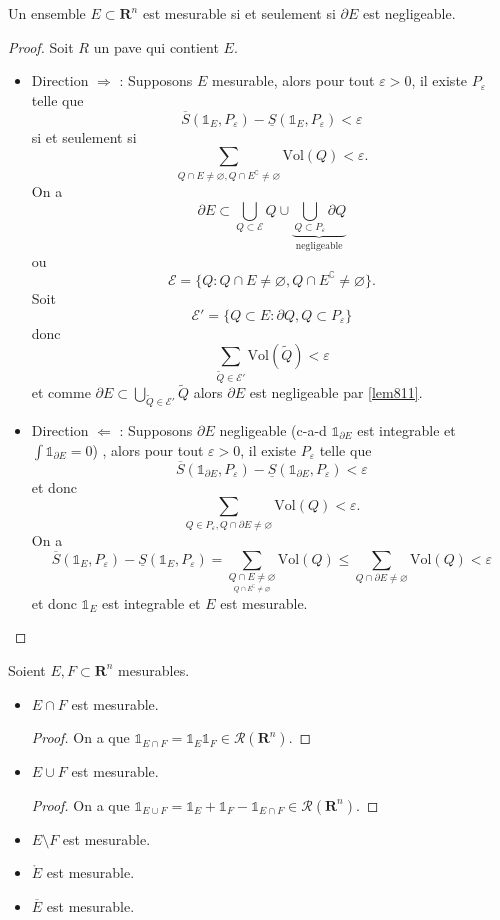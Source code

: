\begin{theorem}
Un ensemble $E\subset \mathbf{R}^{n}$ est mesurable si et seulement si $\partial E$ est negligeable.
\end{theorem}
\begin{proof}
Soit $R$ un pave qui contient $E$. 
\begin{itemize}
\item Direction $\Rightarrow$ : Supposons $E$ mesurable, alors pour tout $\varepsilon>0$, il existe $P_{\varepsilon}$ telle que 
$$
\overline{S}(\mathbb{1}_{E},P_{\varepsilon})-\underline{S}(\mathbb{1}_{E},P_{\varepsilon})<\varepsilon
$$
si et seulement si
$$
\sum _{Q\cap E\neq \varnothing, Q\cap E^{\complement}\neq\varnothing} \mathrm{Vol}(Q)<\varepsilon.
$$
On a 
$$
\partial E\subset \bigcup _{Q\subset \mathcal{E}}Q\cup \underbrace{ \bigcup _{Q\subset P_{\varepsilon}}\partial Q }_{ \text{negligeable} }
$$
ou
$$
\mathcal{E}=\{ Q:Q\cap E\neq \varnothing, Q\cap E^{\complement}\neq \varnothing \}.
$$
Soit 
$$
\mathcal{E}'=\{ Q\subset E:\partial Q,Q\subset P_{\varepsilon} \}
$$
donc
$$
\sum _{\tilde{Q}\in \mathcal{E}'}\mathrm{Vol}(\tilde{Q})<\varepsilon
$$
et comme $\partial E\subset \bigcup _{\tilde{Q}\in \mathcal{E}'}\tilde{Q}$ alors $\partial E$ est negligeable par \ref{lem811}.
\item Direction $\Leftarrow$ : Supposons $\partial E$ negligeable (c-a-d $\mathbb{1}_{\partial E}$ est integrable et $\int \mathbb{1}_{\partial E}=0$) , alors pour tout $\varepsilon>0$, il existe $P_{\varepsilon}$ telle que
$$
\overline{S}(\mathbb{1}_{\partial E},P_{\varepsilon})-\underline{S}(\mathbb{1}_{\partial E},P_{\varepsilon})<\varepsilon
$$
et donc
$$
\sum _{Q\in P_{\varepsilon},Q\cap \partial E\neq \varnothing} \mathrm{Vol}(Q)<\varepsilon.
$$
On a
$$
\overline{S}(\mathbb{1}_{E},P_{\varepsilon})-\underline{S}(\mathbb{1}_{E},P_{\varepsilon})=\sum _{\underset{Q\cap E^{\complement}\neq \varnothing}{Q\cap E\neq \varnothing }}\mathrm{Vol}(Q)\le \sum _{Q\cap \partial E\neq \varnothing}\mathrm{Vol}(Q)<\varepsilon
$$
et donc $\mathbb{1}_{E}$ est integrable et $E$ est mesurable. 
\end{itemize}
\end{proof}
\begin{remark}
Soient $E,F\subset \mathbf{R}^{n}$ mesurables. 
\begin{itemize}
\item $E\cap F$ est mesurable.
\begin{proof}
On a que $\mathbb{1}_{E\cap F}=\mathbb{1}_{E}\mathbb{1}_{F}\in \mathcal{R}(\mathbf{R}^{n})$.
\end{proof}
\item $E\cup F$ est mesurable.
\begin{proof}
On a que $\mathbb{1}_{E\cup F}=\mathbb{1}_{E}+\mathbb{1}_{F}-\mathbb{1}_{E\cap F}\in \mathcal{R}(\mathbf{R}^{n})$.
\end{proof}
\item $E\setminus F$ est mesurable.
\item $\mathring{E}$ est mesurable.
\item $\overline{E}$ est mesurable.
\end{itemize}
\end{remark}
